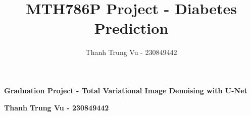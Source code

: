 \documentclass[12pt]{article}
\title{MTH786P Project - Diabetes Prediction}
\author{Thanh Trung Vu - 230849442}
\makeatletter
\renewcommand{\maketitle}{
    {\LARGE \@title \par}      %
    {\large \@author \par}     %
}
\makeatother
\begin{document}
\setlength\parskip{0.5em plus 0.1em minus 0.2em}




\begin{center}
{\large \textbf{Graduation Project - Total Variational Image Denoising with U-Net}}

{\large \textbf{Thanh Trung Vu - 230849442}}
\end{center}




\end{document}
